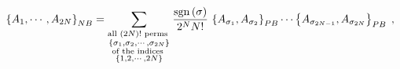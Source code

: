 \begin{equation}
\left\{  A_{1},\cdots,A_{2N}\right\}  _{{\footnotesize NB}}=\sum
_{\substack{\text{all }\left(  2N\right)  !\text{\ perms } \\\left\{
\sigma_{1},\sigma_{2},\cdots,\sigma_{2N}\right\}  \\\text{of the indices }
\\\left\{  1,2,\cdots,2N\right\}  }}\frac{\operatorname{sgn}\left(
\sigma\right)  }{2^{N}N!}\,\left\{  A_{\sigma_{1}},A_{\sigma_{2}}\right\}
_{{\footnotesize PB}}\cdots\left\{  A_{\sigma_{2N-1}},A_{\sigma_{2N}}\right\}
_{{\footnotesize PB}}\;, \label{PBResolution}%
\end{equation}

